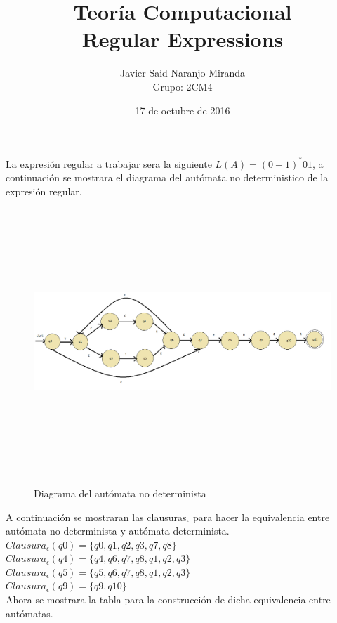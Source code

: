 \documentclass[12pt,letterpaper]{article}
\author{Javier Said Naranjo Miranda\\ Grupo: 2CM4}
\title{Teor\'ia Computacional\\ Regular Expressions}
\date{17 de octubre de 2016}
\begin{document}
\maketitle
\justify
La expresi\'on regular a trabajar sera la siguiente $L(A)= (0+1)^*01$, a continuaci\'on se mostrara el diagrama del aut\'omata no deterministico de la expresi\'on regular.

\begin{figure}[H]
\includegraphics[width=\textwidth, height=10cm]{RE1.png}
\label{fig: RE}
\caption{Diagrama del aut\'omata no determinista}
\end{figure}

\justify
A continuaci\'on se mostraran las clausuras$_\epsilon$ para hacer la equivalencia entre aut\'omata no determinista y aut\'omata  determinista.\\
$Clausura_\epsilon(q0)=\{q0,q1,q2,q3,q7,q8\}$\\
$Clausura_\epsilon(q4)=\{q4,q6,q7,q8,q1,q2,q3\}$\\
$Clausura_\epsilon(q5)=\{q5,q6,q7,q8,q1,q2,q3\}$\\
$Clausura_\epsilon(q9)=\{q9,q10\}$\\

Ahora se mostrara la tabla para la construcci\'on de dicha equivalencia entre aut\'omatas.\\
\end{document}
